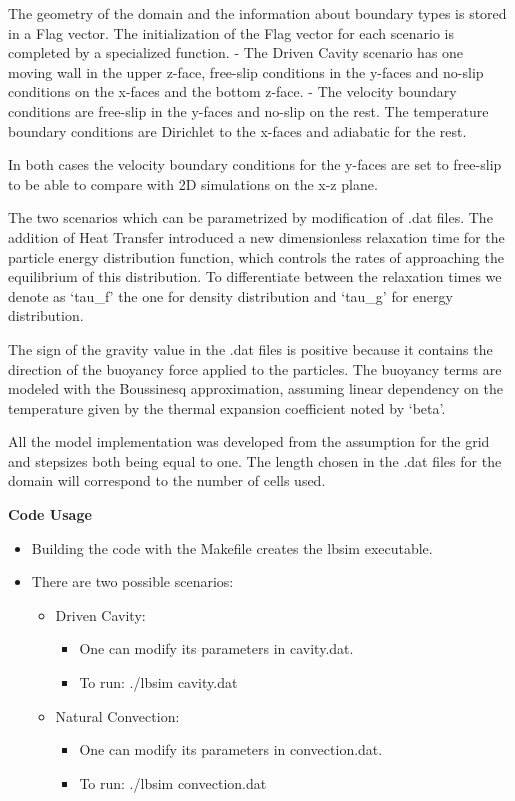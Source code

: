 \documentclass[]{article}
\providecommand{\tightlist}{%
  \setlength{\itemsep}{0pt}\setlength{\parskip}{0pt}}
\begin{document}
The geometry of the domain and the information about boundary types is
stored in a Flag vector. The initialization of the Flag vector for each
scenario is completed by a specialized function. - The Driven Cavity
scenario has one moving wall in the upper z-face, free-slip conditions
in the y-faces and no-slip conditions on the x-faces and the bottom
z-face. - The velocity boundary conditions are free-slip in the y-faces
and no-slip on the rest. The temperature boundary conditions are
Dirichlet to the x-faces and adiabatic for the rest.

In both cases the velocity boundary conditions for the y-faces are set
to free-slip to be able to compare with 2D simulations on the x-z plane.

The two scenarios which can be parametrized by modification of .dat
files. The addition of Heat Transfer introduced a new dimensionless
relaxation time for the particle energy distribution function, which
controls the rates of approaching the equilibrium of this distribution.
To differentiate between the relaxation times we denote as `tau\_f' the
one for density distribution and `tau\_g' for energy distribution.

The sign of the gravity value in the .dat files is positive because it
contains the direction of the buoyancy force applied to the particles.
The buoyancy terms are modeled with the Boussinesq approximation,
assuming linear dependency on the temperature given by the thermal
expansion coefficient noted by `beta'.

All the model implementation was developed from the assumption for the
grid and stepsizes both being equal to one. The length chosen in the
.dat files for the domain will correspond to the number of cells used.



\textbf{Code Usage}

\begin{itemize}
\tightlist
\item
  Building the code with the Makefile creates the lbsim executable.
\item
  There are two possible scenarios:

  \begin{itemize}
  \tightlist
  \item
    Driven Cavity:

    \begin{itemize}
    \tightlist
    \item
      One can modify its parameters in cavity.dat.
    \item
      To run: ./lbsim cavity.dat
    \end{itemize}
  \item
    Natural Convection:

    \begin{itemize}
    \tightlist
    \item
      One can modify its parameters in convection.dat.
    \item
      To run: ./lbsim convection.dat
    \end{itemize}
  \end{itemize}
\end{itemize}
\end{document}
